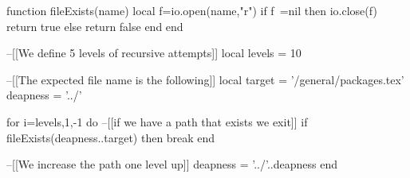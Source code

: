\begin{luacode}
function fileExists(name)
   local f=io.open(name,"r")
   if f~=nil then io.close(f) return true else return false end
end

--[[We define 5 levels of recursive attempts]]
local levels = 10

--[[The expected file name is the following]]
local target = '/general/packages.tex'
deapness = '../'

for i=levels,1,-1 do
    --[[if we have a path that exists we exit]]
    if fileExists(deapness..target) then break end

    --[[We increase the path one level up]]
    deapness = '../'..deapness
end
\end{luacode}